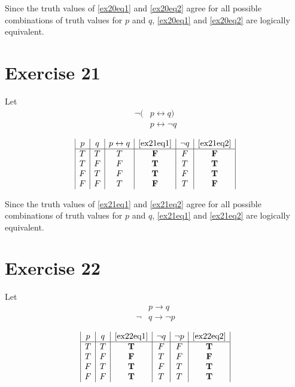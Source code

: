 \documentclass{article}
\let\biconditional\leftrightarrow
\let\conditional\rightarrow
\begin{document}
Since the truth values of \eqref{ex20eq1} and \eqref{ex20eq2} agree for all possible combinations of truth values for $p$ and $q$, \eqref{ex20eq1} and \eqref{ex20eq2} are logically equivalent.

\pagebreak

\section{Exercise 21}
Let
\begin{align}
	\neg ( & p \biconditional q) \label{ex21eq1}     \\
	       & p \biconditional \neg q \label{ex21eq2}
\end{align}

\[
	\begin{array}{|c|c|c|c|c|c|}
		p & q & p \biconditional q & \eqref{ex21eq1} & \neg q & \eqref{ex21eq2} \\
		\hline
		T & T & T                  & \textbf{F}      & F      & \textbf{F}      \\
		T & F & F                  & \textbf{T}      & T      & \textbf{T}      \\
		F & T & F                  & \textbf{T}      & F      & \textbf{T}      \\
		F & F & T                  & \textbf{F}      & T      & \textbf{F}
	\end{array}
\]

Since the truth values of \eqref{ex21eq1} and \eqref{ex21eq2} agree for all possible combinations of truth values for $p$ and $q$, \eqref{ex21eq1} and \eqref{ex21eq2} are logically equivalent.

\pagebreak

\section{Exercise 22}
Let
\begin{align}
	     & p \conditional q \label{ex22eq1}      \\
	\neg & q \conditional \neg p \label{ex22eq2}
\end{align}

\[
	\begin{array}{|c|c|c|c|c|c|}
		p & q & \eqref{ex22eq1} & \neg q & \neg p & \eqref{ex22eq2} \\
		\hline
		T & T & \textbf{T}      & F      & F      & \textbf{T}      \\
		T & F & \textbf{F}      & T      & F      & \textbf{F}      \\
		F & T & \textbf{T}      & F      & T      & \textbf{T}      \\
		F & F & \textbf{T}      & T      & T      & \textbf{T}
	\end{array}
\]
\end{document}
